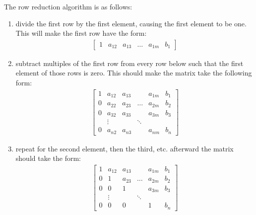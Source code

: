 \documentclass{article}
\theoremstyle{mytheoremstyle}
\theoremstyle{mytheoremstyle}
\theoremstyle{myproblemstyle}
\begin{document}
    The row reduction algorithm is as follows:
    \begin{enumerate}
        \item divide the first row by the first element, causing the first
            element to be one. This will make the first row have the form:
        \begin{align*}
            \begin{bmatrix}
                1 & a_{12} & a_{13} & \ldots & a_{1m} & b_1
            \end{bmatrix}
        \end{align*}

        \item subtract multiples of the first row from every row below such that
        the first element of those rows is zero. This should make the matrix
        take the following form:
        \begin{align*}
            \begin{bmatrix}
                1 & a_{12} & a_{13} &        & a_{1m} & b_1 \\
                0 & a_{22} & a_{23} & \ldots & a_{2m} & b_2 \\
                0 & a_{32} & a_{33} &        & a_{3m} & b_3 \\
                  & \vdots &        & \ddots &        &     \\
                0 & a_{n2} & a_{n3} &        & a_{nm} & b_n
            \end{bmatrix}
        \end{align*}

        \item repeat for the second element, then the third, etc. afterward the
        matrix should take the form:
        \begin{align*}
            \begin{bmatrix}
                1 & a_{12} & a_{13} &        & a_{1m} & b_1 \\
                0 & 1      & a_{23} & \ldots & a_{2m} & b_2 \\
                0 & 0      & 1      &        & a_{3m} & b_3 \\
                  & \vdots &        & \ddots &        &     \\
                0 & 0      & 0      &        & 1      & b_n
            \end{bmatrix}
        \end{align*}


\end{enumerate}
\end{document}
